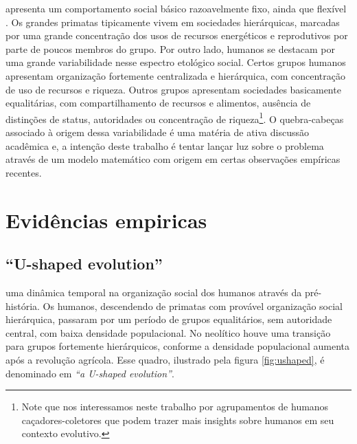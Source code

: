  apresenta um comportamento social básico razoavelmente fixo, ainda que flexível \citep{Boehm2001}. Os grandes primatas tipicamente vivem em sociedades hierárquicas, marcadas por uma grande concentração dos usos de recursos energéticos e reprodutivos por parte de poucos membros do grupo. Por outro lado, humanos se destacam por uma grande variabilidade nesse espectro etológico social. Certos grupos humanos apresentam organização fortemente centralizada e hierárquica, com concentração de uso de recursos e riqueza. Outros grupos apresentam sociedades basicamente equalitárias, com compartilhamento de recursos e alimentos, ausência de distinções de status, autoridades ou concentração de riqueza\footnote{Note que nos interessamos neste trabalho por agrupamentos de humanos caçadores-coletores que podem trazer mais insights sobre humanos em seu contexto evolutivo.}. O quebra-cabeças associado à origem dessa variabilidade é uma matéria de ativa discussão acadêmica e, a intenção deste trabalho é tentar lançar luz sobre o problema através de um modelo matemático com origem em certas observações empíricas recentes.

\section{Evidências empiricas}

\subsection{``U-shaped evolution''} 
 uma dinâmica temporal na organização social dos humanos através da pré-história\cite[-3cm]{Knauft1991, Marcus2008, Foley1987}. Os humanos, descendendo de primatas com provável organização social hierárquica, passaram por um período de grupos equalitários, sem autoridade central, com baixa densidade populacional. No neolítico houve uma transição para grupos fortemente hierárquicos, conforme a densidade populacional aumenta após a revolução agrícola. Esse quadro, ilustrado pela figura \ref{fig:ushaped}, é denominado em \citep{Knauft1991} \emph{``a U-shaped evolution''}. 

